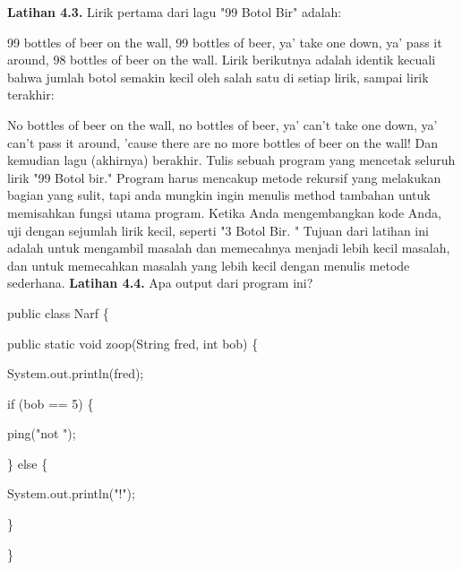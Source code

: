 \newline
\textbf{Latihan 4.3.} Lirik pertama dari lagu "99 Botol Bir" adalah:
\newline
\par
99 bottles of beer on the wall, 99 bottles of beer, ya’ take one
down, ya’ pass it around, 98 bottles of beer on the wall.
\newline
\newline
Lirik berikutnya adalah identik kecuali bahwa jumlah botol semakin kecil oleh salah satu di setiap lirik, sampai lirik terakhir:
\newline
\par
No bottles of beer on the wall, no bottles of beer, ya’ can’t take one down, ya’ can’t pass it around, ’cause there are no more
bottles of beer on the wall!
\newline
\newline
Dan kemudian lagu (akhirnya) berakhir.
\newline
\newline
Tulis sebuah program yang mencetak seluruh lirik "99 Botol bir." Program harus mencakup metode rekursif yang melakukan bagian yang sulit, tapi anda mungkin ingin menulis method tambahan untuk memisahkan fungsi utama program.
\newline
\newline
Ketika Anda mengembangkan kode Anda, uji dengan sejumlah lirik kecil, seperti "3 Botol Bir. "
\newline
\newline
Tujuan dari latihan ini adalah untuk mengambil masalah dan memecahnya menjadi lebih kecil masalah, dan untuk memecahkan masalah yang lebih kecil dengan menulis metode sederhana.
\newline
\newline
\textbf{Latihan 4.4.} Apa output dari program ini?
\newline
\par
public class Narf \{
\par
	public static void zoop(String fred, int bob) \{
	\par
		System.out.println(fred);
		\par
		if (bob == 5) \{
		\par
			ping("not ");
			\par
		\} else \{
		\par
		System.out.println("!");
		\par
	\}
	\par
\}
\newline
\par
